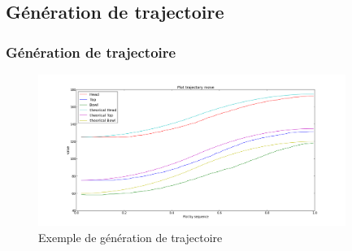 \subsection{Génération de trajectoire}
\begin{frame}
  \frametitle{Génération de trajectoire}
            \begin{figure}
                \begin{center}
                    \includegraphics[width=10cm]{../img/TrajectoryPlot.png}
                \end{center}
                \caption{Exemple de génération de trajectoire}
            \end{figure}
\end{frame}
